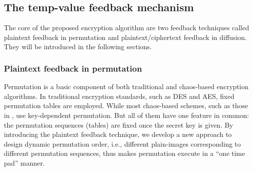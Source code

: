 \documentclass[3p,preprint,11pt]{elsarticle}
\begin{document}
\subsection{The temp-value feedback mechanism}
The core of the proposed encryption algorithm are two feedback techniques called
plaintext feedback in permutation and plaintext/ciphertext feedback in diffusion.
They will be introduced in the following sections.

\subsubsection{Plaintext feedback in permutation}
\label{sec:permutation}
Permutation is a basic component of both traditional and chaos-based encryption algorithms.
In traditional encryption standards, such as DES and AES, fixed permutation tables are employed.
While most chaos-based schemes, such as those in
\cite{Fridrich:ChaoticImageEncryption:IJBC98,Chen:3DChaoticCipher:CSF04,Mao:3Dbakermap:Optic2009,Zhang:ImageCrypt:SCSF07},
use key-dependent permutation. But all of them have one feature in common: the
permutation sequences (tables) are fixed once the secret key is given.
By introducing the plaintext feedback technique, we develop a new approach to design
dynamic permutation order, i.e., different plain-images corresponding to different permutation sequences,
thus makes permutation execute in a ``one time pad'' manner.
\end{document}
